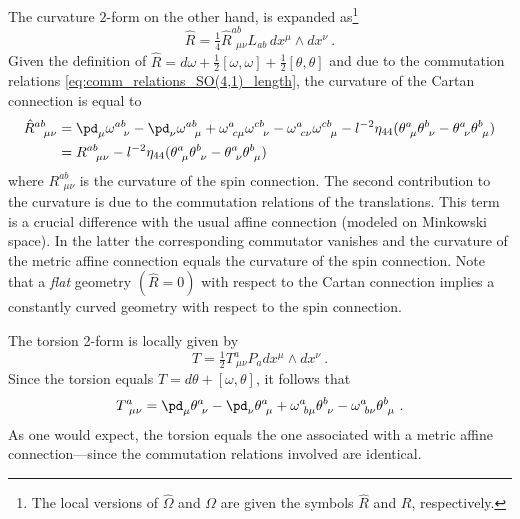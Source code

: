 \documentclass[11pt]{amsart}
\begin{document}
The curvature $2$-form on the other hand, is expanded 
as\footnote{The local versions of $\hat{\Omega}$ and $\Omega$ are 
	given the symbols $\hat{R}$ and $R$, respectively.}
%
\begin{displaymath}
	\hat{R} = \tfrac{1}{4} \hat{R}^{ab}_{~~\mu\nu} L_{ab}\, dx^\mu 
	\wedge dx^\nu~.
\end{displaymath}
Given the definition of $\hat{R} = d\omega + 
\tfrac{1}{2}[\omega,\omega] + \tfrac{1}{2}[\theta,\theta]$ and 
due to the commutation relations 
\eqref{eq:comm_relations_SO(4,1)_length}, the curvature of the 
Cartan connection is equal to
%
\begin{displaymath}
	\begin{split}
		\hat{R}^{ab}_{~~\mu\nu} &= \pd_\mu \omega^{ab}_{~~\nu} - 
		\pd_\nu \omega^{ab}_{~~\mu} + 
		\omega^a_{~c\mu}\omega^{cb}_{~~\nu} - 
		\omega^a_{~c\nu}\omega^{cb}_{~~\mu} - l^{-2} \eta_{44} 
		(\theta^a_{~\mu}\theta^b_{~\nu} - 
		\theta^a_{~\nu}\theta^b_{~\mu}) \\
		&= R^{ab}_{~~\mu\nu} - 
		l^{-2}\eta_{44}(\theta^a_{~\mu}\theta^b_{~\nu} - 
		\theta^a_{~\nu}\theta^b_{~\mu})
	\end{split}
\end{displaymath}
where $R^{ab}_{~~\mu\nu}$ is the curvature of the spin 
connection. The second contribution to the curvature is due to 
the commutation relations of the translations. This term is a 
crucial difference with the usual affine connection (modeled on 
Minkowski space). In the latter the corresponding commutator 
vanishes and the curvature of the metric affine connection equals 
the curvature of the spin connection. Note that a \emph{flat} 
geometry $(\hat{R} = 0)$ with respect to the Cartan connection 
implies a constantly curved geometry with respect to the spin 
connection. {}

The torsion 2-form is locally given by
%
\begin{displaymath}
	T = \tfrac{1}{2} T^a_{~\mu\nu} P_a dx^\mu \wedge dx^\nu~.
\end{displaymath}
Since the torsion equals $T = d\theta + [\omega,\theta]$, it 
follows that
%
\begin{displaymath}
	T^a_{~\mu\nu} = \pd_\mu\theta^a_{~\nu} - 
	\pd_\nu\theta^a_{~\mu} + \omega^a_{~b\mu}\theta^b_{~\nu} - 
	\omega^a_{~b\nu}\theta^b_{~\mu}~.
\end{displaymath}
As one would expect, the torsion equals the one associated with a 
metric affine connection---since the commutation relations 
involved are identical.
\end{document}
